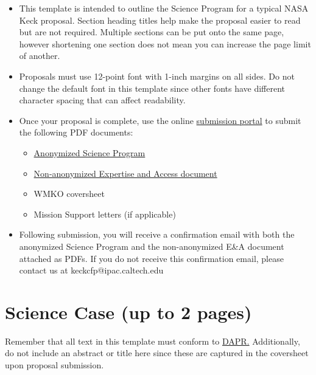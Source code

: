 \documentclass[12pt]{article}
\begin{document}
\noindent
\begin{itemize}
\item
This template is intended to outline the Science Program for a typical NASA Keck proposal. Section heading titles help make the 
proposal easier to read but are not required. Multiple sections can be put onto the same page, however shortening one section does not mean you can 
increase the page limit of another.
\item
Proposals must use 12-point font with 1-inch margins on all sides.  Do not change the default font in this template since other fonts have 
different character spacing that can affect readability.
\item
Once your proposal is complete, use the online \href{https://catcopy.ipac.caltech.edu/nasakeck/proposal.php}{submission portal}
to submit the following PDF documents:
\begin{itemize}
\item
\href{https://nexsci.caltech.edu/missions/KeckSolicitation/gen-info.shtml#Ibi}{Anonymized Science Program}
\item
\href{https://nexsci.caltech.edu/missions/KeckSolicitation/gen-info.shtml#Ibii}{Non-anonymized Expertise and Access document}
\item
WMKO coversheet
\item
Mission Support letters (if applicable)
\end{itemize}
\item
Following submission, you will receive a confirmation email with both the anonymized Science Program and the non-anonymized E\&A document attached as PDFs.  If you do not receive this confirmation email, please contact us at keckcfp@ipac.caltech.edu

\end{itemize}

\newpage




\section{Science Case (up to 2 pages)}

\noindent
Remember that all text in this template must conform to 
\href{https://nexsci.caltech.edu/missions/KeckSolicitation/DAPR_proposer.shtml}{DAPR.} 
Additionally, do not include an abstract or title here since these are captured
 in the coversheet upon proposal submission. \\
\end{document}

